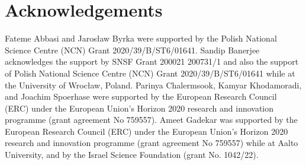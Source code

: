 \documentclass[11pt]{article}
\begin{document}
\section*{Acknowledgements}
Fateme Abbasi and Jaros\l{}aw Byrka were supported by the Polish National Science Centre (NCN) Grant 2020/39/B/ST6/01641. 
Sandip Banerjee acknowledges the support by SNSF Grant 200021 200731/1 and also the support of Polish National Science Centre (NCN) Grant 2020/39/B/ST6/01641 while at the University of Wroc\l{}aw, Poland.
Parinya Chalermsook, Kamyar Khodamoradi, and Joachim Spoerhase were supported by the European Research Council (ERC) under the European Union’s Horizon 2020 research and innovation programme (grant agreement No 759557).  
Ameet Gadekar was supported by the European Research Council (ERC) under the European Union’s Horizon 2020 research and innovation programme (grant agreement No 759557) while at Aalto University, and by the Israel Science Foundation (grant No. 1042/22).


 
 
%
\end{document}
